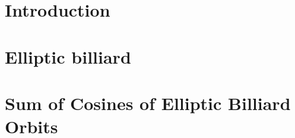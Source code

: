 \section{Introduction}
\label{sec:05-intro}


\section{Elliptic billiard}
\label{sec:05-elliptic_billiard}


\section{Sum of Cosines of Elliptic Billiard Orbits}
\label{sec:05-invariant_elliptic_billiard}
